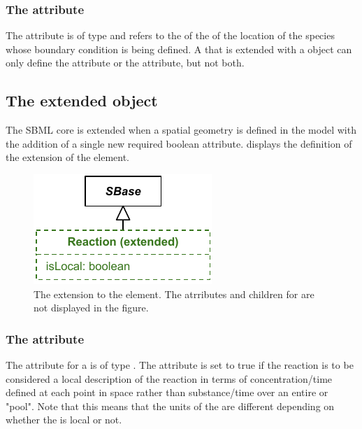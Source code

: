 \subsubsection{The \fixttspace{} attribute}
The  attribute is of type  and refers to the  of the \DomainType of the location of the species whose boundary condition is being defined. A \Parameter that is extended with a \BoundaryCondition object can only define the  attribute or the  attribute, but not both. 


\subsection{The extended \Reaction object}
\label{extended-reaction-class}
The SBML core \Reaction is extended when a spatial geometry is defined in the model with the addition of a single new required boolean  attribute.  displays the definition of the extension of the \Reaction element.
 
\begin{figure}[ht]
  \includegraphics{figs/extended-reaction-uml}
  \caption{The extension to the \Reaction element. The \sbmlthreecore atrributes and children for \Reaction are not displayed in the figure.}
  \label{reaction-uml}
\end{figure}

\subsubsection{The \fixttspace{} attribute}
The  attribute for a \Reaction is of type . The attribute is set to true if the reaction is to be considered a local description of the reaction in terms of concentration/time defined at each point in space rather than substance/time over an entire \Compartment or "pool".  Note that this means that the units of the \KineticLaw are different depending on whether the \Reaction is local or not.

